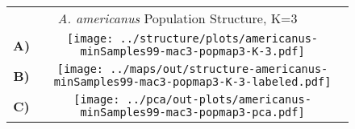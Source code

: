 \documentclass[border=10pt,varwidth=30cm]{standalone}
\begin{document}
\begin{figure}
\begin{tabular}[t]{cc}
    \multicolumn{2}{c}{\Large \textit{A. americanus} Population Structure, K=3} \\
  {\textbf{\large A)}} & \texttt{[image: ../structure/plots/americanus-minSamples99-mac3-popmap3-K-3.pdf]} \\ \vspace{1mm}
  {\textbf{\large B)}} & \texttt{[image: ../maps/out/structure-americanus-minSamples99-mac3-popmap3-K-3-labeled.pdf]} \\
  {\textbf{\large C)}} & \texttt{[image: ../pca/out-plots/americanus-minSamples99-mac3-popmap3-pca.pdf]} \\
\end{tabular}
\end{figure}
\end{document}
